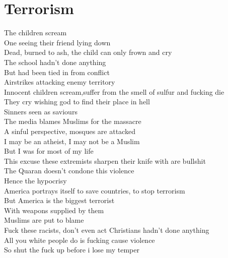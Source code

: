 \documentclass[12pt, b5paper]{article}
\begin{document}
\newpage 

\section{Terrorism}
\par The children scream
\\One seeing their friend lying down
\\Dead, burned to ash, the child can only frown and cry
\\The school hadn't done anything
\\But had been tied in from conflict
\\Airstrikes attacking enemy territory
\\Innocent children scream,suffer from the smell of sulfur and fucking die
\\They cry wishing god to find their place in hell
\\Sinners seen as saviours
\\The media blames Muslims for the massacre
\\A sinful perspective, mosques are attacked
\\I  may be an atheist, I may not be a Muslim
\\But I was for most of my life
\\This excuse these extremists sharpen their knife with are bullshit
\\The Quaran doesn't condone this violence
\\Hence the hypocrisy
\\America portrays itself to save countries, to stop terrorism
\\But America is the biggest terrorist
\\With weapons supplied by them
\\Muslims are put to blame
\\Fuck these racists, don't even act Christians hadn't done anything
\\All you white people do is fucking cause violence
\\So shut the fuck up before i lose my temper 

\newpage
\end{document}
